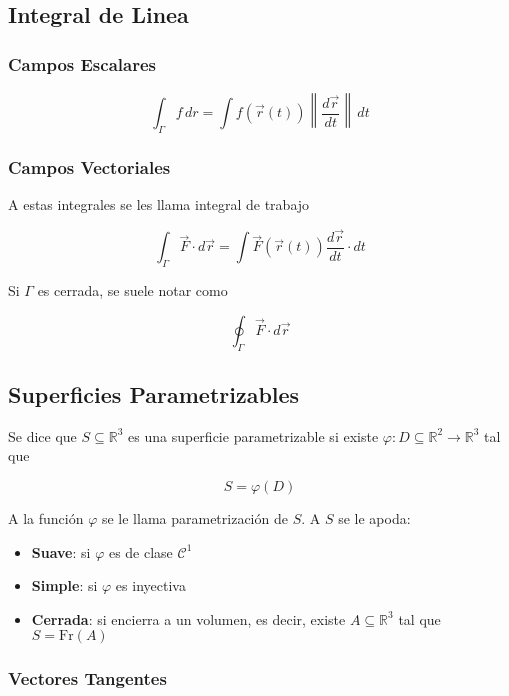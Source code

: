 \subsection{Integral de Linea}

\subsubsection{Campos Escalares}

\[\int_\Gamma f\, dr= \int f(\Vec{r}(t))\left\|
\frac{d\Vec{r}}{dt}\right\|\,dt\]

\subsubsection{Campos Vectoriales}

A estas integrales se les llama integral de trabajo

\[\int_\Gamma \Vec{F}\cdot d\Vec{r}=
\int \Vec{F}(\Vec{r}(t))\frac{d\Vec{r}}{dt}\cdot dt\]

Si $\Gamma$ es cerrada, se suele notar como

\[\oint_\Gamma \Vec{F}\cdot d\Vec{r}\]

\subsection{Superficies Parametrizables}

Se dice que $S\subseteq\mathbb{R}^3$ es una superficie parametrizable si existe $\varphi:D\subseteq\mathbb{R}^2\to\mathbb{R}^3$ tal que

\[S = \varphi(D)\]

A la función $\varphi$ se le llama parametrización de $S$. A $S$ se le apoda:

\begin{itemize}
    \item \textbf{Suave}: si $\varphi$ es de clase $\mathcal{C}^1$
    \item \textbf{Simple}: si $\varphi$ es inyectiva
    \item \textbf{Cerrada}: si encierra a un volumen, es decir, existe $A\subseteq\mathbb{R}^3$ tal que\newline $S=\mathrm{Fr}(A)$
\end{itemize}

\subsubsection{Vectores Tangentes}

